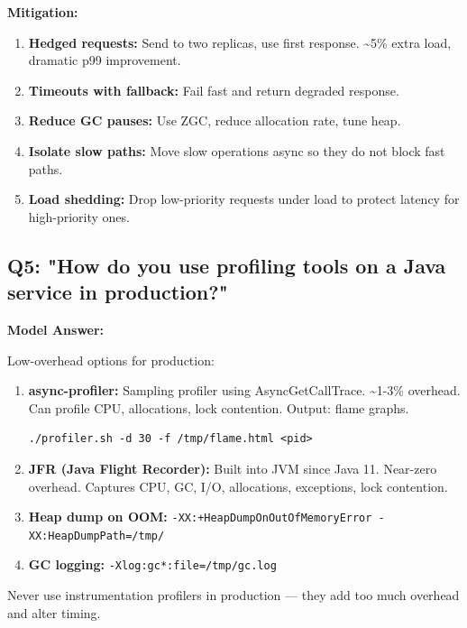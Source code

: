 \documentclass[11pt]{article}
\providecommand{\tightlist}{\setlength{\itemsep}{1pt}\setlength{\parskip}{0pt}}
\begin{document}
\textbf{Mitigation:}

\begin{enumerate}
\def\labelenumi{\arabic{enumi}.}
\tightlist
\item
  \textbf{Hedged requests:} Send to two replicas, use first response. \textasciitilde5\% extra load, dramatic p99 improvement.
\item
  \textbf{Timeouts with fallback:} Fail fast and return degraded response.
\item
  \textbf{Reduce GC pauses:} Use ZGC, reduce allocation rate, tune heap.
\item
  \textbf{Isolate slow paths:} Move slow operations async so they do not block fast paths.
\item
  \textbf{Load shedding:} Drop low-priority requests under load to protect latency for high-priority ones.
\end{enumerate}

\subsection{Q5: "How do you use profiling tools on a Java service in production?"}\label{q5-how-do-you-use-profiling-tools-on-a-java-service-in-production}

\textbf{Model Answer:}

Low-overhead options for production:

\begin{enumerate}
\def\labelenumi{\arabic{enumi}.}
\tightlist
\item
  \textbf{async-profiler:} Sampling profiler using AsyncGetCallTrace. \textasciitilde1-3\% overhead. Can profile CPU, allocations, lock contention. Output: flame graphs.

  \setcodelang{}

\begin{verbatim}
./profiler.sh -d 30 -f /tmp/flame.html <pid>
\end{verbatim}
\item
  \textbf{JFR (Java Flight Recorder):} Built into JVM since Java 11. Near-zero overhead. Captures CPU, GC, I/O, allocations, exceptions, lock contention.
\item
  \textbf{Heap dump on OOM:} \texttt{-XX:+HeapDumpOnOutOfMemoryError\ -XX:HeapDumpPath=/tmp/}
\item
  \textbf{GC logging:} \texttt{-Xlog:gc*:file=/tmp/gc.log}
\end{enumerate}

Never use instrumentation profilers in production --- they add too much overhead and alter timing.
\end{document}
